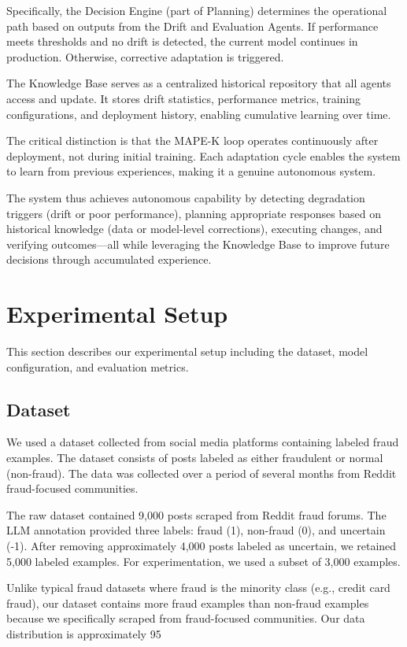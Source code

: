 \documentclass{svproc}
\begin{document}
Specifically, the Decision Engine (part of Planning) determines the operational path based on outputs from the Drift and Evaluation Agents. If performance meets thresholds and no drift is detected, the current model continues in production. Otherwise, corrective adaptation is triggered.

The Knowledge Base serves as a centralized historical repository that all agents access and update. It stores drift statistics, performance metrics, training configurations, and deployment history, enabling cumulative learning over time.

The critical distinction is that the MAPE-K loop operates continuously after deployment, not during initial training. Each adaptation cycle enables the system to learn from previous experiences, making it a genuine autonomous system.

The system thus achieves autonomous capability by detecting degradation triggers (drift or poor performance), planning appropriate responses based on historical knowledge (data or model-level corrections), executing changes, and verifying outcomes---all while leveraging the Knowledge Base to improve future decisions through accumulated experience.

\section{Experimental Setup}\label{sec:experimental}
This section describes our experimental setup including the dataset, model configuration, and evaluation metrics.

\subsection{Dataset}
We used a dataset collected from social media platforms containing labeled fraud examples. The dataset consists of posts labeled as either fraudulent or normal (non-fraud). The data was collected over a period of several months from Reddit fraud-focused communities.

The raw dataset contained 9,000 posts scraped from Reddit fraud forums. The LLM annotation provided three labels: fraud (1), non-fraud (0), and uncertain (-1). After removing approximately 4,000 posts labeled as uncertain, we retained 5,000 labeled examples. For experimentation, we used a subset of 3,000 examples.

Unlike typical fraud datasets where fraud is the minority class (e.g., credit card fraud), our dataset contains more fraud examples than non-fraud examples because we specifically scraped from fraud-focused communities. Our data distribution is approximately 95%
\end{document}
